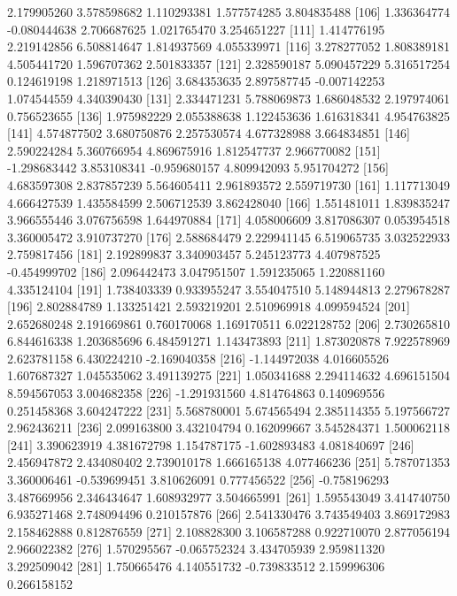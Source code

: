 \documentclass[12pt]{article}
\begin{document}
\begin{Schunk}
\begin{Soutput}
 [101]  2.179905260  3.578598682  1.110293381  1.577574285  3.804835488
 [106]  1.336364774 -0.080444638  2.706687625  1.021765470  3.254651227
 [111]  1.414776195  2.219142856  6.508814647  1.814937569  4.055339971
 [116]  3.278277052  1.808389181  4.505441720  1.596707362  2.501833357
 [121]  2.328590187  5.090457229  5.316517254  0.124619198  1.218971513
 [126]  3.684353635  2.897587745 -0.007142253  1.074544559  4.340390430
 [131]  2.334471231  5.788069873  1.686048532  2.197974061  0.756523655
 [136]  1.975982229  2.055388638  1.122453636  1.616318341  4.954763825
 [141]  4.574877502  3.680750876  2.257530574  4.677328988  3.664834851
 [146]  2.590224284  5.360766954  4.869675916  1.812547737  2.966770082
 [151] -1.298683442  3.853108341 -0.959680157  4.809942093  5.951704272
 [156]  4.683597308  2.837857239  5.564605411  2.961893572  2.559719730
 [161]  1.117713049  4.666427539  1.435584599  2.506712539  3.862428040
 [166]  1.551481011  1.839835247  3.966555446  3.076756598  1.644970884
 [171]  4.058006609  3.817086307  0.053954518  3.360005472  3.910737270
 [176]  2.588684479  2.229941145  6.519065735  3.032522933  2.759817456
 [181]  2.192899837  3.340903457  5.245123773  4.407987525 -0.454999702
 [186]  2.096442473  3.047951507  1.591235065  1.220881160  4.335124104
 [191]  1.738403339  0.933955247  3.554047510  5.148944813  2.279678287
 [196]  2.802884789  1.133251421  2.593219201  2.510969918  4.099594524
 [201]  2.652680248  2.191669861  0.760170068  1.169170511  6.022128752
 [206]  2.730265810  6.844616338  1.203685696  6.484591271  1.143473893
 [211]  1.873020878  7.922578969  2.623781158  6.430224210 -2.169040358
 [216] -1.144972038  4.016605526  1.607687327  1.045535062  3.491139275
 [221]  1.050341688  2.294114632  4.696151504  8.594567053  3.004682358
 [226] -1.291931560  4.814764863  0.140969556  0.251458368  3.604247222
 [231]  5.568780001  5.674565494  2.385114355  5.197566727  2.962436211
 [236]  2.099163800  3.432104794  0.162099667  3.545284371  1.500062118
 [241]  3.390623919  4.381672798  1.154787175 -1.602893483  4.081840697
 [246]  2.456947872  2.434080402  2.739010178  1.666165138  4.077466236
 [251]  5.787071353  3.360006461 -0.539699451  3.810626091  0.777456522
 [256] -0.758196293  3.487669956  2.346434647  1.608932977  3.504665991
 [261]  1.595543049  3.414740750  6.935271468  2.748094496  0.210157876
 [266]  2.541330476  3.743549403  3.869172983  2.158462888  0.812876559
 [271]  2.108828300  3.106587288  0.922710070  2.877056194  2.966022382
 [276]  1.570295567 -0.065752324  3.434705939  2.959811320  3.292509042
 [281]  1.750665476  4.140551732 -0.739833512  2.159996306  0.266158152

\end{Soutput}
\end{Schunk}
\end{document}
